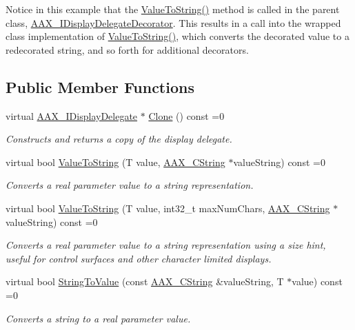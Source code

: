 Notice in this example that the \hyperlink{a00094_ada5780cfa332ac7946bf95aa65ae96f5}{Value\+To\+String()} method is called in the parent class, \hyperlink{a00094}{A\+A\+X\+\_\+\+I\+Display\+Delegate\+Decorator}. This results in a call into the wrapped class\textquotesingle{} implementation of \hyperlink{a00094_ada5780cfa332ac7946bf95aa65ae96f5}{Value\+To\+String()}, which converts the decorated value to a redecorated string, and so forth for additional decorators. \subsection*{Public Member Functions}
\begin{DoxyCompactItemize}
\item 
virtual \hyperlink{a00092}{A\+A\+X\+\_\+\+I\+Display\+Delegate} $\ast$ \hyperlink{a00092_a138a82c124ddda8255ce39194dfc1f3f}{Clone} () const =0
\begin{DoxyCompactList}\small\item\em Constructs and returns a copy of the display delegate. \end{DoxyCompactList}\item 
virtual bool \hyperlink{a00092_a7fd1e2f55055c817937bbfa66b73b2fd}{Value\+To\+String} (T value, \hyperlink{a00042}{A\+A\+X\+\_\+\+C\+String} $\ast$value\+String) const =0
\begin{DoxyCompactList}\small\item\em Converts a real parameter value to a string representation. \end{DoxyCompactList}\item 
virtual bool \hyperlink{a00092_a471c7381db773683b69216a9c3f5eda7}{Value\+To\+String} (T value, int32\+\_\+t max\+Num\+Chars, \hyperlink{a00042}{A\+A\+X\+\_\+\+C\+String} $\ast$value\+String) const =0
\begin{DoxyCompactList}\small\item\em Converts a real parameter value to a string representation using a size hint, useful for control surfaces and other character limited displays. \end{DoxyCompactList}\item 
virtual bool \hyperlink{a00092_aed5224775c9f733f091afddfba057d5e}{String\+To\+Value} (const \hyperlink{a00042}{A\+A\+X\+\_\+\+C\+String} \&value\+String, T $\ast$value) const =0
\begin{DoxyCompactList}\small\item\em Converts a string to a real parameter value. \end{DoxyCompactList}\end{DoxyCompactItemize}


